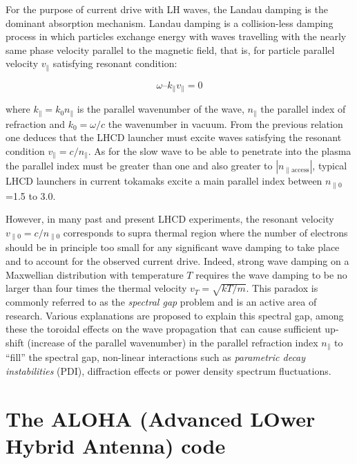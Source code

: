 For the purpose of current drive with LH waves, the Landau damping is the dominant absorption mechanism. Landau damping is a collision-less damping process in which particles exchange energy with waves travelling with the nearly same phase velocity parallel to the magnetic field, that is, for particle parallel velocity $v_{\parallel}$ satisfying resonant condition:

$$\omega – k_{\parallel} v_{\parallel} = 0 $$ 

where $k_{\parallel}=k_0 n_{\parallel}$ is the parallel wavenumber of the wave, $n_{\parallel}$ the parallel index of refraction and $k_0= \omega/c$ the wavenumber in vacuum. From the previous relation one deduces that the LHCD launcher must excite waves satisfying the resonant condition $v_{\parallel}=c/n_{\parallel}$. As for the slow wave to be able to penetrate into the plasma the parallel index must be greater than one and also greater to $|n_{\parallel \mathrm{access}}|$, typical LHCD launchers in current tokamaks excite a main parallel index between $n_{\parallel 0}$=1.5 to 3.0. 

However, in many past and present LHCD experiments, the resonant velocity $v_{\parallel 0}=c/n_{\parallel 0}$ corresponds to supra thermal region where the number of electrons should be in principle too small for any significant wave damping to take place and to account for the observed current drive. Indeed, strong wave damping on a Maxwellian distribution with temperature $T$ requires the wave damping to be no larger than four times the thermal velocity $v_T=\sqrt{k T/m}$. This paradox is commonly referred to as the \emph{spectral gap} problem and is an active area of research. Various explanations are proposed to explain this spectral gap, among these the toroidal effects on the wave propagation that can cause sufficient up-shift (increase of the parallel wavenumber) in the parallel refraction index $n_{\parallel}$ to “fill” the spectral gap, non-linear interactions such as \textit{parametric decay instabilities} (PDI), diffraction effects or power density spectrum fluctuations. 



\clearpage
\section{The ALOHA (Advanced LOwer Hybrid Antenna) code}\label{sec:ALOHA}
